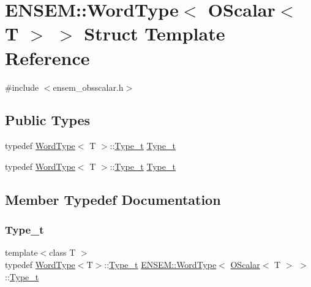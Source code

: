 \hypertarget{structENSEM_1_1WordType_3_01OScalar_3_01T_01_4_01_4}{}\section{E\+N\+S\+EM\+:\+:Word\+Type$<$ O\+Scalar$<$ T $>$ $>$ Struct Template Reference}
\label{structENSEM_1_1WordType_3_01OScalar_3_01T_01_4_01_4}


{\ttfamily \#include $<$ensem\+\_\+obsscalar.\+h$>$}

\subsection*{Public Types}
\begin{DoxyCompactItemize}
\item 
typedef \mbox{\hyperlink{structENSEM_1_1WordType}{Word\+Type}}$<$ T $>$\+::\mbox{\hyperlink{structENSEM_1_1WordType_3_01OScalar_3_01T_01_4_01_4_a8fa9533e78185900519355e6b5dc8ab5}{Type\+\_\+t}} \mbox{\hyperlink{structENSEM_1_1WordType_3_01OScalar_3_01T_01_4_01_4_a8fa9533e78185900519355e6b5dc8ab5}{Type\+\_\+t}}
\item 
typedef \mbox{\hyperlink{structENSEM_1_1WordType}{Word\+Type}}$<$ T $>$\+::\mbox{\hyperlink{structENSEM_1_1WordType_3_01OScalar_3_01T_01_4_01_4_a8fa9533e78185900519355e6b5dc8ab5}{Type\+\_\+t}} \mbox{\hyperlink{structENSEM_1_1WordType_3_01OScalar_3_01T_01_4_01_4_a8fa9533e78185900519355e6b5dc8ab5}{Type\+\_\+t}}
\end{DoxyCompactItemize}


\subsection{Member Typedef Documentation}
\mbox{\label{structENSEM_1_1WordType_3_01OScalar_3_01T_01_4_01_4_a8fa9533e78185900519355e6b5dc8ab5}} 
\subsubsection{\texorpdfstring{Type\_t}{Type\_t}\hspace{0.1cm}{\footnotesize\ttfamily [1/2]}}
{\footnotesize\ttfamily template$<$class T $>$ \\
typedef \mbox{\hyperlink{structENSEM_1_1WordType}{Word\+Type}}$<$T$>$\+::\mbox{\hyperlink{structENSEM_1_1WordType_3_01OScalar_3_01T_01_4_01_4_a8fa9533e78185900519355e6b5dc8ab5}{Type\+\_\+t}} \mbox{\hyperlink{structENSEM_1_1WordType}{E\+N\+S\+E\+M\+::\+Word\+Type}}$<$ \mbox{\hyperlink{classENSEM_1_1OScalar}{O\+Scalar}}$<$ T $>$ $>$\+::\mbox{\hyperlink{structENSEM_1_1WordType_3_01OScalar_3_01T_01_4_01_4_a8fa9533e78185900519355e6b5dc8ab5}{Type\+\_\+t}}}

